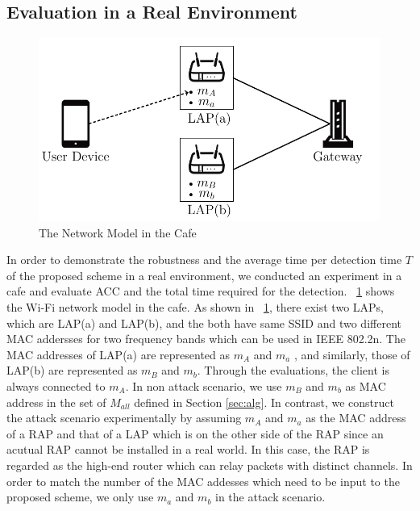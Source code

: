 \documentclass[conference]{IEEEtran}
\newcommand{\stba}{m_{a}}
\newcommand{\stbA}{m_{A}}
\newcommand{\stbb}{m_{b}}
\newcommand{\stbB}{m_{B}}
\begin{document}
\subsection{Evaluation in a Real Environment}
\begin{figure}[t]
    \begin{center}
        \includegraphics[scale=0.5]{starbucks/starbucks.pdf}
        \caption{The Network Model in the Cafe}
        \label{fig:sbx}
    \end{center}
    \vspace{-1zh}
\end{figure}
In order to demonstrate the robustness and the average time per detection time $T$ of the proposed scheme in a real environment, we conducted an experiment in a cafe and evaluate ACC and the total time required for the detection.
\figurename~\ref{fig:sbx} shows the Wi-Fi network model in the cafe.
As shown in \figurename~\ref{fig:sbx}, there exist two LAPs, which are LAP(a) and LAP(b), and the both have same SSID and two different MAC addersses for two frequency bands which can be used in IEEE 802.2n.
The MAC addresses of LAP(a) are represented as $\stbA$ and $\stba$ , and similarly, those of LAP(b) are represented as $\stbB$ and $\stbb$.
Through the evaluations, the client is always connected to $\stbA$.
In non attack scenario, we use $\stbB$ and $\stbb$ as MAC address in the set of $M_{all}$ defined in Section \ref{sec:alg}.
In contrast, we construct the attack scenario experimentally by assuming $\stbA$ and $\stba$ as the MAC address of a RAP and that of a LAP which is on the other side of the RAP since an acutual RAP cannot be installed in a real world.
In this case, the RAP is regarded as the high-end router which can relay packets with distinct channels.
In order to match the number of the MAC addesses which need to be input to the proposed scheme, we only use $\stba$ and $\stbb$ in the attack scenario.
\end{document}
